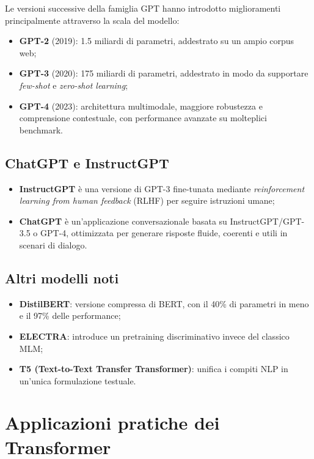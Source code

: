 Le versioni successive della famiglia GPT hanno introdotto miglioramenti principalmente attraverso la scala del modello:
\begin{itemize}
    \item \textbf{GPT-2} (2019): 1.5 miliardi di parametri, addestrato su un ampio corpus web;
    \item \textbf{GPT-3} (2020): 175 miliardi di parametri, addestrato in modo da supportare \textit{few-shot} e \textit{zero-shot learning};
    \item \textbf{GPT-4} (2023): architettura multimodale, maggiore robustezza e comprensione contestuale, con performance avanzate su molteplici benchmark.
\end{itemize}

\subsection{ChatGPT e InstructGPT}

\begin{itemize}
    \item \textbf{InstructGPT} è una versione di GPT-3 fine-tunata mediante \textit{reinforcement learning from human feedback} (RLHF) per seguire istruzioni umane;
    \item \textbf{ChatGPT} è un'applicazione conversazionale basata su InstructGPT/GPT-3.5 o GPT-4, ottimizzata per generare risposte fluide, coerenti e utili in scenari di dialogo.
\end{itemize}

\subsection{Altri modelli noti}

\begin{itemize}
    \item \textbf{DistilBERT}: versione compressa di BERT, con il 40\% di parametri in meno e il 97\% delle performance;
    \item \textbf{ELECTRA}: introduce un pretraining discriminativo invece del classico MLM;
    \item \textbf{T5 (Text-to-Text Transfer Transformer)}: unifica i compiti NLP in un’unica formulazione testuale.
\end{itemize}

\section{Applicazioni pratiche dei Transformer}

